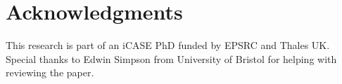 \section*{Acknowledgments}
This research is part of an iCASE PhD funded by EPSRC and Thales UK. Special thanks to 
Edwin Simpson from University of Bristol for helping with reviewing the paper.